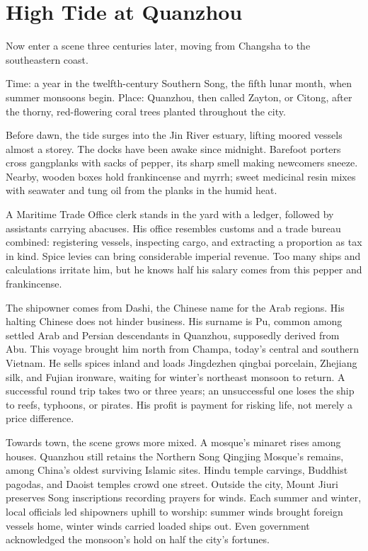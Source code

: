 \section{High Tide at Quanzhou}
Now enter a scene three centuries later, moving from Changsha to the southeastern coast.

Time: a year in the twelfth-century Southern Song, the fifth lunar month, when summer monsoons begin. Place: Quanzhou, then called Zayton, or Citong, after the thorny, red-flowering coral trees planted throughout the city.

Before dawn, the tide surges into the Jin River estuary, lifting moored vessels almost a storey. The docks have been awake since midnight. Barefoot porters cross gangplanks with sacks of pepper, its sharp smell making newcomers sneeze. Nearby, wooden boxes hold frankincense and myrrh; sweet medicinal resin mixes with seawater and tung oil from the planks in the humid heat.

A Maritime Trade Office clerk stands in the yard with a ledger, followed by assistants carrying abacuses. His office resembles customs and a trade bureau combined: registering vessels, inspecting cargo, and extracting a proportion as tax in kind. Spice levies can bring considerable imperial revenue. Too many ships and calculations irritate him, but he knows half his salary comes from this pepper and frankincense.

The shipowner comes from Dashi, the Chinese name for the Arab regions. His halting Chinese does not hinder business. His surname is Pu, common among settled Arab and Persian descendants in Quanzhou, supposedly derived from Abu. This voyage brought him north from Champa, today's central and southern Vietnam. He sells spices inland and loads Jingdezhen qingbai porcelain, Zhejiang silk, and Fujian ironware, waiting for winter's northeast monsoon to return. A successful round trip takes two or three years; an unsuccessful one loses the ship to reefs, typhoons, or pirates. His profit is payment for risking life, not merely a price difference.

Towards town, the scene grows more mixed. A mosque's minaret rises among houses. Quanzhou still retains the Northern Song Qingjing Mosque's remains, among China's oldest surviving Islamic sites. Hindu temple carvings, Buddhist pagodas, and Daoist temples crowd one street. Outside the city, Mount Jiuri preserves Song inscriptions recording prayers for winds. Each summer and winter, local officials led shipowners uphill to worship: summer winds brought foreign vessels home, winter winds carried loaded ships out. Even government acknowledged the monsoon's hold on half the city's fortunes.

